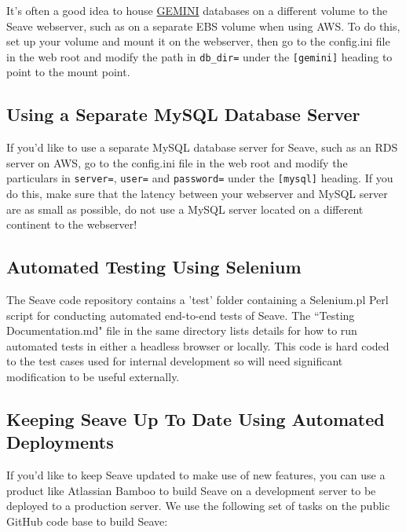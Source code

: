 \documentclass[11pt, a4paper]{article}
\newcommand{\GEMINI}{\href{https://gemini.readthedocs.io}{GEMINI} } %
\begin{document}
It's often a good idea to house \GEMINI databases on a different volume to the Seave webserver, such as on a separate EBS volume when using AWS. To do this, set up your volume and mount it on the webserver, then go to the config.ini file in the web root and modify the path in \texttt{db\_dir=} under the \texttt{[gemini]} heading to point to the mount point.


\subsection{Using a Separate MySQL Database Server}

If you'd like to use a separate MySQL database server for Seave, such as an RDS server on AWS, go to the config.ini file in the web root and modify the particulars in \texttt{server=}, \texttt{user=} and \texttt{password=} under the \texttt{[mysql]} heading. If you do this, make sure that the latency between your webserver and MySQL server are as small as possible, do not use a MySQL server located on a different continent to the webserver!


\subsection{Automated Testing Using Selenium}

The Seave code repository contains a 'test' folder containing a Selenium.pl Perl script for conducting automated end-to-end tests of Seave. The ``Testing Documentation.md" file in the same directory lists details for how to run automated tests in either a headless browser or locally. This code is hard coded to the test cases used for internal development so will need significant modification to be useful externally.


\subsection{Keeping Seave Up To Date Using Automated Deployments}

If you'd like to keep Seave updated to make use of new features, you can use a product like Atlassian Bamboo to build Seave on a development server to be deployed to a production server. We use the following set of tasks on the public GitHub code base to build Seave:
\end{document}
